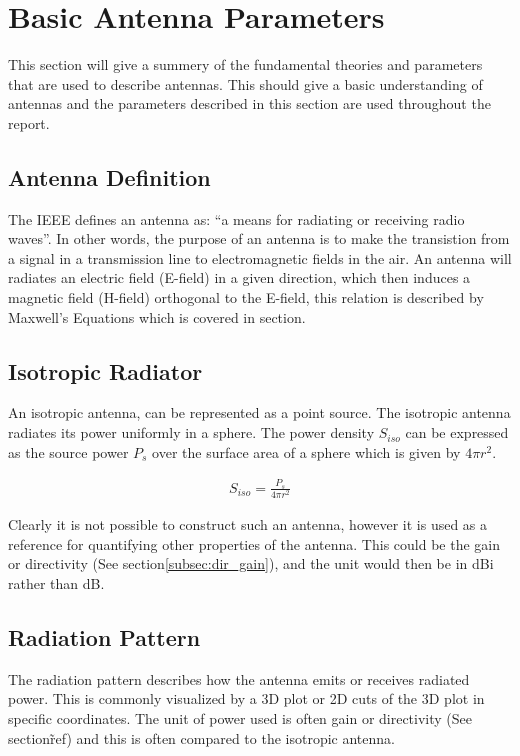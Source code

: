 \section{Basic Antenna Parameters}
This section will give a summery of the fundamental theories and parameters that are used to describe antennas. This should give a basic understanding of antennas and the parameters described in this section are used throughout the report. 

\subsection{Antenna Definition}
\label{subsec:antenna-def}
The IEEE defines an antenna as: ``a means for radiating or receiving radio waves''. In other words, the purpose of an antenna is to make the transistion from a signal in a transmission line to electromagnetic fields in the air. An antenna will radiates an electric field (E-field) in a given direction, which then induces a magnetic field (H-field) orthogonal to the E-field, this relation is described by Maxwell's Equations which is covered in section. 

\subsection{Isotropic Radiator}
\label{subsec:isotropic-ant}
An isotropic antenna, can be represented as a point source. The isotropic antenna radiates its power uniformly in a sphere. The power density $S_{iso}$ can be expressed as the source power $P_s$ over the surface area of a sphere which is given by $4\pi r^2$. 

\begin{align}
  S_{iso} = \frac{P_s}{4\pi r^2}
\end{align}

Clearly it is not possible to construct such an antenna, however it is used as a reference for quantifying other properties of the antenna. This could be the gain or directivity (See section\ref{subsec:dir_gain}), and the unit would then be in \si{dBi} rather than \si{dB}.

\subsection{Radiation Pattern}
\label{subsec:radiation-p}
The radiation pattern describes how the antenna emits or receives radiated power. This is commonly visualized by a 3D plot or 2D cuts of the 3D plot in specific coordinates. The unit of power used is often gain or directivity (See section\~ref{}) and this is often compared to the isotropic antenna. 

